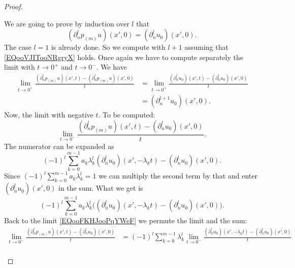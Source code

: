 \begin{proof}
\begin{subproof}
            We are going to prove by induction over \( l\) that
            \begin{equation}        \label{EQooVJITooNRgryX}
                (\partial_n^lp_{(m)}u)(x',0)=(\partial_n^lu_0)(x',0).
            \end{equation}
            The case \( l=1\) is already done. So we compute with \( l+1\) assuming that \eqref{EQooVJITooNRgryX} holds. Once again we have to compute separately the limit with \( t\to 0^+\) and \( t\to 0^-\). We have
            \begin{subequations}
                \begin{align}
                    \lim_{t\to 0^+} \frac{ (\partial_n^lp_{(m)}u)(x',t)-(\partial_n^lp_{(m)}u)(x',0) }{ t }&=\lim_{t\to 0^+} \frac{   (\partial_n^lu_0)(x',t)-  (\partial_n^lu_0)(x',0) }{ t }\\
                &=(\partial^{l+1}_nu_0)(x',0).
                \end{align}
            \end{subequations}
            Now, the limit with negative \( t\). To be computed:
            \begin{equation}    \label{EQooFKHJooPqYWeF}
                \lim_{t\to 0^-} \frac{ (\partial^l_np_{(m)}u)(x',t)-(\partial_n^lu_0)(x',0) }{ t }.
            \end{equation}
            The numerator can be expanded as
            \begin{equation}
                (-1)^l\sum_{k=0}^{m-1}a_k\lambda_k^l(\partial_n^lu_0)(x',-\lambda_kt)-(\partial_n^lu_0)(x',0).
            \end{equation}
            Since \( (-1)^l\sum_{k=0}^{m-1}a_k\lambda_k^l=1\) we can multiply the second term by that and enter \( (\partial_n^lu_0)(x',0)\) in the sum. What we get is
            \begin{equation}
                (-1)^l\sum_{k=0}^{m-1}a_k\lambda_k^l\big( (\partial_n^lu_0)(x',-\lambda_k t)-(\partial_{n}^lu_0)(x',0) \big).
            \end{equation}
            Back to the limit \eqref{EQooFKHJooPqYWeF} we permute the limit and the sum:
            \begin{subequations}
                \begin{align}
                    \lim_{t\to 0^-} \frac{ (\partial^l_np_{(m)}u)(x',t)-(\partial_n^lu_0)(x',0) }{ t }&=(-1)^l\sum_{k=0}^{m-1}\lambda_k^l\lim_{t\to 0^-} \frac{ (\partial_n^lu_0)(x',-\lambda_kt)-(\partial_n^lu_0)(x',0) }{ t }\\

\end{align}
\end{subequations}
\end{subproof}
\end{proof}
